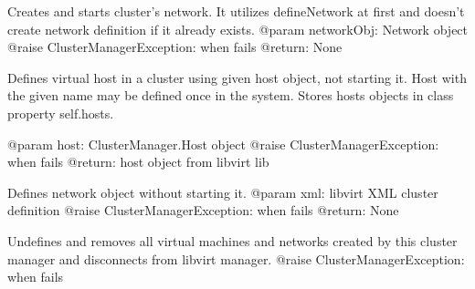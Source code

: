 \documentclass[letterpaper,10pt,english]{sphinxmanual}
\begin{document}
\begin{fulllineitems}

\begin{fulllineitems}
\label{ref-manual/XrdTest:XrdTest.ClusterManager.ClusterManager.createNetwork}
Creates and starts cluster's network. It utilizes defineNetwork
at first and doesn't create network definition if it already exists.
@param networkObj: Network object
@raise ClusterManagerException: when fails
@return: None

\end{fulllineitems}


\begin{fulllineitems}
\label{ref-manual/XrdTest:XrdTest.ClusterManager.ClusterManager.defineHost}
Defines virtual host in a cluster using given host object,
not starting it. Host with the given name may be defined once
in the system. Stores hosts objects in class property self.hosts.

@param host: ClusterManager.Host object
@raise ClusterManagerException: when fails
@return: host object from libvirt lib

\end{fulllineitems}


\begin{fulllineitems}
\label{ref-manual/XrdTest:XrdTest.ClusterManager.ClusterManager.defineNetwork}
Defines network object without starting it.
@param xml: libvirt XML cluster definition
@raise ClusterManagerException: when fails
@return: None

\end{fulllineitems}


\begin{fulllineitems}
\label{ref-manual/XrdTest:XrdTest.ClusterManager.ClusterManager.disconnect}
Undefines and removes all virtual machines and networks created
by this cluster manager and disconnects from libvirt manager.
@raise ClusterManagerException: when fails


\end{fulllineitems}
\end{fulllineitems}
\end{document}
